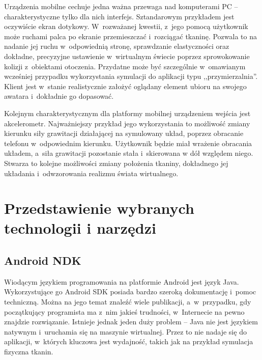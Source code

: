 		
		Urządzenia mobilne cechuje jedna ważna przewaga nad komputerami PC -- charakterystyczne tylko dla nich interfejs. Sztandarowym przykładem jest oczywiście ekran dotykowy. W~rozważanej kwestii, z~jego pomocą użytkownik może ruchami palca po ekranie przemieszczać i~rozciągać tkaninę. Pozwala to na nadanie jej ruchu w~odpowiednią stronę, sprawdzanie elastyczności oraz dokładne, precyzyjne ustawienie w~wirtualnym świecie poprzez sprowokowanie kolizji z~obiektami otoczenia. Przydatne może być szczególnie w~omawianym wcześniej przypadku wykorzystania symulacji do aplikacji typu ,,przymierzalnia''. Klient jest w~stanie realistycznie założyć oglądany element ubioru na swojego awatara i~dokładnie go dopasować. 
		
		Kolejnym charakterystycznym dla platformy mobilnej urządzeniem wejścia jest akcelerometr. Najważniejszy przykład jego wykorzystania to możliwość zmiany kierunku siły grawitacji działającej na symulowany układ, poprzez obracanie telefonu w~odpowiednim kierunku. Użytkownik będzie miał wrażenie obracania układem, a~siła grawitacji pozostanie stała i~skierowana w dół względem niego. Stwarza to kolejne możliwości zmiany położenia tkaniny, dokładnego jej układania i~odwzorowania realizmu świata wirtualnego.

	
	\section{Przedstawienie wybranych technologii i narzędzi}
	\label{t:technologie:narzedzia}
	
		\subsection{Android NDK}
		\label{t:technologie:narzedzia:ndk}
		
		
		Wiodącym językiem programowania na platformie Android jest język Java. Wykorzystujące go Android SDK posiada bardzo szeroką dokumentację i~pomoc techniczną. Można na jego temat znaleźć wiele publikacji, a~w~przypadku, gdy początkujący programista ma z~nim jakieś trudności, w~Internecie na pewno znajdzie rozwiązanie. Istnieje jednak jeden duży problem -- Java nie jest językiem natywnym i~uruchamia się na maszynie wirtualnej. Przez to nie nadaje się do aplikacji, w~których kluczowa jest wydajność, takich jak na przykład symulacja fizyczna tkanin.
		
